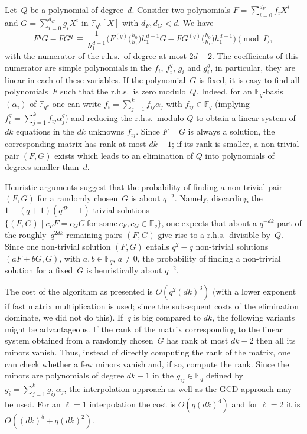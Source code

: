 \documentclass[11pt]{llncs}
\newcommand{\F}{\mathbb F}
\begin{document}
Let~$Q$ be a polynomial of degree~$d$.
Consider two polynomials $F = \sum_{i=0}^{d_F} f_i X^i$ and
$G = \sum_{i=0}^{d_G} g_i X^i$ in $\F_{q^k}[X]$ with $d_F, d_G < d$.
We have
\[ F^qG-FG^q \,\equiv\, \frac{1} {h_1^{d-1}} \Big( F^{(q)}
  \big( \tfrac{h_0} {h_1} \big) h_1^{d-1} G - F G^{(q)}
  \big( \tfrac{h_0} {h_1} \big) h_1^{d-1} \Big) \pmod{I}, \]
with the numerator of the r.h.s.\ of degree at most $2 d \!-\! 2$.
The coefficients of this numerator are simple polynomials in the $f_i$,
$f_i^q$, $g_i$ and $g_i^q$, in particular, they are linear in each of these
variables.
If the polynomial~$G$ is fixed, it is easy to find all polynomials~$F$ such
that the r.h.s.\ is zero modulo~$Q$.
Indeed, for an $\F_q$-basis $(\alpha_i)$ of $\F_{q^k}$ one can write
$f_i = \sum_{j=1}^k f_{ij} \alpha_j$ with $f_{ij} \in \F_q$ (implying
$f_i^q = \sum_{j=1}^k f_{ij} \alpha_j^q$) and reducing the r.h.s.\ modulo $Q$
to obtain a linear system of $d k$ equations in the $d k$ unknowns $f_{ij}$.
Since $F=G$ is always a solution, the corresponding matrix has rank at
most $d k \!-\! 1$; if its rank is smaller, a non-trivial pair $(F, G)$ exists
which leads to an elimination of $Q$ into polynomials of degrees smaller
than~$d$.

Heuristic arguments suggest that the probability of finding a non-trivial
pair $(F, G)$ for a randomly chosen~$G$ is about $q^{-2}$.
Namely, discarding the $1 + (q \!+\! 1) (q^{d k} \!-\! 1)$ trivial solutions
$\{ (F, G) \mid c_F F = c_G G \ \text{for some} \ c_F, c_G \in \F_q \}$, one
expects that about a $q^{-d k}$ part of the roughly~$q^{2 d k}$ remaining
pairs $(F, G)$ give rise to a r.h.s.\ divisible by~$Q$.
Since one non-trivial solution $(F, G)$ entails $q^2 \!-\! q$ non-trivial
solutions $(a F + b G, G)$, with $a, b \in \F_q$, $a \ne 0$, the
probability of finding a non-trivial solution for a fixed~$G$ is
heuristically about $q^{-2}$.

The cost of the algorithm as presented is $O(q^2 (d k)^3)$ (with a
lower exponent if fast matrix multiplication is used; since the
subsequent costs of the elimination dominate, we did not do this).
If~$q$ is big compared to $d k$, the following variants might be
advantageous.  If the rank of the matrix corresponding to the linear
system obtained from a randomly chosen~$G$ has rank at most
$d k \!-\! 2$ then all its minors vanish.
Thus, instead of directly computing the rank of the matrix, one can
check whether a few minors vanish and, if so, compute the rank.
Since the minors are polynomials of degree $d k \!-\! 1$ in the
$g_{ij} \in \F_q$ defined by $g_i = \sum_{j=1}^k g_{ij} \alpha_j$, the
interpolation approach as well as the GCD approach may be used.
For an $\ell = 1$ interpolation the cost is $O(q (dk)^4)$ and for
$\ell = 2$ it is $O((dk)^5 \!+\! q(dk)^2)$.
\end{document}
